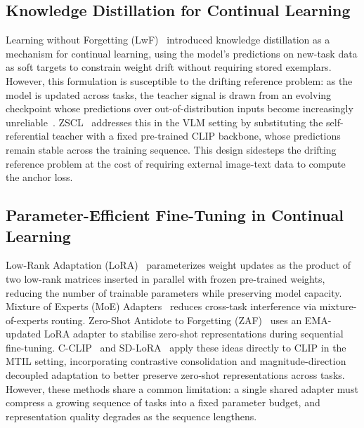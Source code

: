 \documentclass{article}
\let\cite\citep
\begin{document}
  \subsection{Knowledge Distillation for Continual Learning}
  Learning without Forgetting (LwF)~\cite{li2017lwf} introduced knowledge
  distillation as a mechanism for continual learning, using the model's predictions
  on new-task data as soft targets to constrain weight drift without requiring
  stored exemplars. However, this formulation is susceptible to the drifting
  reference problem: as the model is updated across tasks, the teacher signal is
  drawn from an evolving checkpoint whose predictions over out-of-distribution
  inputs become increasingly unreliable~\cite{li2017lwf}. ZSCL~\cite{zheng2023zscl}
  addresses this in the VLM setting by substituting the self-referential teacher
  with a fixed pre-trained CLIP backbone, whose predictions remain stable across the
  training sequence. This design sidesteps the drifting reference problem at the
  cost of requiring external image-text data to compute the anchor loss.

  \subsection{Parameter-Efficient Fine-Tuning in Continual Learning}
  Low-Rank Adaptation (LoRA)~\cite{hu2022lora} parameterizes weight updates as the product of two low-rank matrices inserted in parallel with frozen pre-trained
  weights, reducing the number of trainable parameters while preserving model
  capacity. Mixture of Experts (MoE) Adapters~\cite{yu2024moe} reduces cross-task interference via
  mixture-of-experts routing. Zero-Shot Antidote to Forgetting (ZAF)~\cite{gao2024zaf} uses an EMA-updated LoRA
  adapter to stabilise zero-shot representations during sequential fine-tuning.
  C-CLIP~\cite{liu2025cclip} and SD-LoRA~\cite{wu2025sdlora} apply these ideas
  directly to CLIP in the MTIL setting, incorporating contrastive consolidation and
  magnitude-direction decoupled adaptation to better preserve zero-shot
  representations across tasks. However, these methods share a common limitation:
  a single shared adapter must compress a growing sequence of tasks into a fixed
  parameter budget, and representation quality degrades as the sequence lengthens.
\end{document}
